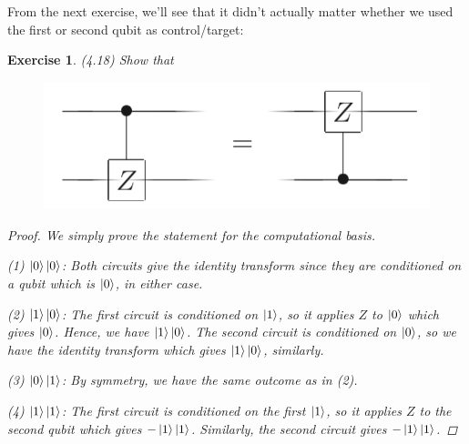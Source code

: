 \documentclass[11pt]{article}
\newcommand\0{\mathbf{0}}
\newcommand\<{\langle}
\renewcommand\>{\rangle}
\newtheorem{exercise}[theorem]{Exercise}
\begin{document}
From the next exercise, we'll see that it didn't actually matter whether we used the first or second qubit as control/target:

\begin{exercise}(4.18) Show that
	
\begin{figure}[H]
\centering
\includegraphics[width=.4\linewidth]{images/4_18.png}
\end{figure}

\begin{proof}
We simply prove the statement for the computational basis. 

(1) $\ket{0}\ket{0}$: Both circuits give the identity transform since they are conditioned on a qubit which is $\ket{0}$, in either case.

(2) $\ket{1}\ket{0}$: The first circuit is conditioned on $\ket{1}$, so it applies $Z$ to $\ket{0}$ which gives $\ket{0}$. Hence, we have $\ket{1}\ket{0}$. The second circuit is conditioned on $\ket{0}$, so we have the identity transform which gives $\ket{1}\ket{0}$, similarly.

(3) $\ket{0}\ket{1}$: By symmetry, we have the same outcome as in (2). 

(4) $\ket{1}\ket{1}$: The first circuit is conditioned on the first $\ket{1}$, so it applies $Z$ to the second qubit which gives $-\ket{1}\ket{1}$. Similarly, the second circuit gives $-\ket{1}\ket{1}$.
\end{proof}
\end{exercise}
\end{document}
